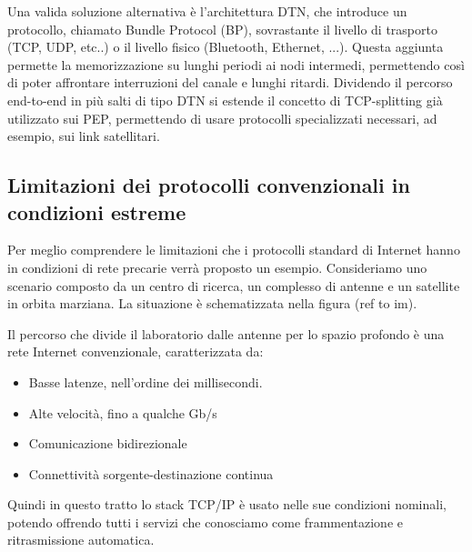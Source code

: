 \documentclass[a4paper]{article}
\begin{document}
		Una valida soluzione alternativa è l'architettura DTN, che introduce un protocollo, chiamato Bundle Protocol (BP), sovrastante il livello di trasporto (TCP, UDP, etc..) o il livello fisico (Bluetooth, Ethernet, ...). Questa aggiunta permette la memorizzazione su lunghi periodi ai nodi intermedi, permettendo così di poter affrontare interruzioni del canale e lunghi ritardi. Dividendo il percorso end-to-end in più salti di tipo DTN si estende il concetto di TCP-splitting già utilizzato sui PEP, permettendo di usare protocolli specializzati necessari, ad esempio, sui link satellitari.
		
		\subsection{Limitazioni dei protocolli convenzionali in condizioni estreme}
		
		Per meglio comprendere le limitazioni che i protocolli standard di Internet hanno in condizioni di rete precarie verrà proposto un esempio. Consideriamo uno scenario composto da un centro di ricerca, un complesso di antenne e un satellite in orbita marziana. La situazione è schematizzata nella figura (ref to im). 
		
		Il percorso che divide il laboratorio dalle antenne per lo spazio profondo è una rete Internet convenzionale, caratterizzata da:
		\begin{itemize}
			\item Basse latenze, nell'ordine dei millisecondi.
			\item Alte velocità, fino a qualche Gb/s
			\item Comunicazione bidirezionale
			\item Connettività sorgente-destinazione continua
		\end{itemize}
		Quindi in questo tratto lo stack TCP/IP è usato nelle sue condizioni nominali, potendo offrendo tutti i servizi che conosciamo come frammentazione e ritrasmissione automatica. 
		
\end{document}
